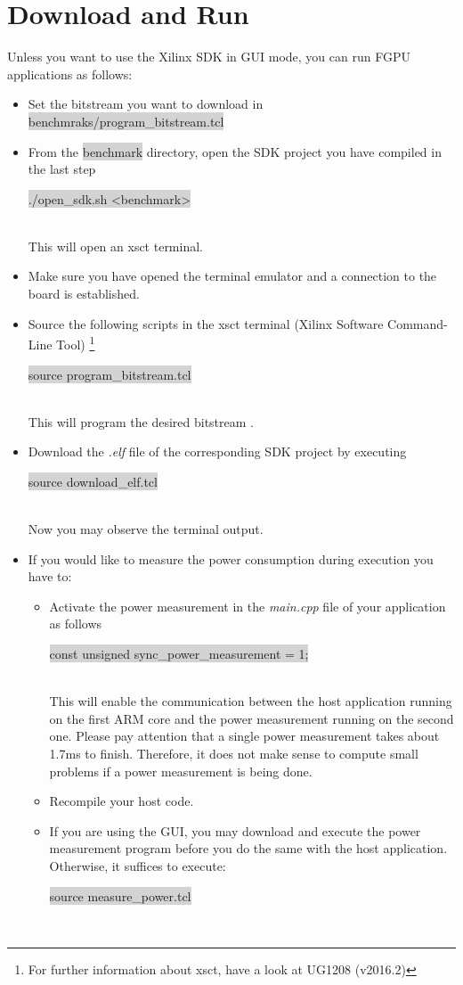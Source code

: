 \documentclass[11pt]{article}
\begin{document}
\section{Download and Run}
  Unless you want to use the Xilinx SDK in GUI mode, you can run FGPU applications as follows:
\begin{itemize}
  \item Set the bitstream you want to download in \colorbox{lightGray}{benchmraks/program\_bitstream.tcl}
  \item From the \colorbox{lightGray}{benchmark} directory, open the SDK project you have compiled in the last step \\
    \centerline{\colorbox{lightGray}{./open\_sdk.sh <benchmark>}} \\
  This will open an xsct terminal.
  \item Make sure you have opened the terminal emulator and a connection to the board is established.
  \item Source the following scripts in the xsct terminal (Xilinx Software Command-Line Tool) \footnote{
    For further information about xsct, have a look at UG1208 (v2016.2)}\\
    \centerline{\colorbox{lightGray}{source program\_bitstream.tcl}} \\
    This will program the desired bitstream .
  \item Download the \emph{.elf} file of the corresponding SDK project by executing\\
    \centerline{\colorbox{lightGray}{source download\_elf.tcl}} \\
  Now you may observe the terminal output.
  \item If you would like to measure the power consumption during execution you have to:
    \begin{itemize}
      \item Activate the power measurement in the \emph{main.cpp} file of your application as follows \\
      \centerline{\colorbox{lightGray}{const unsigned sync\_power\_measurement = 1; }} \\
      This will enable the communication between the host application running on the first ARM core 
      and the power measurement running on the second one.
      Please pay attention that a single power measurement takes about 1.7ms to finish.
      Therefore, it does not make sense to compute small problems if a power measurement is being done.
    \item Recompile your host code.
    \item If you are using the GUI, you may download and execute the power measurement program before you do the same with the host application.
      Otherwise, it suffices to execute: \\
      \centerline{\colorbox{lightGray}{source measure\_power.tcl }} \\
    \end{itemize}
\end{itemize}
\end{document}
